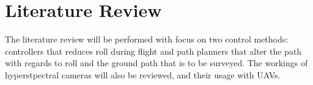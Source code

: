 \section{Literature Review}

The literature review will be performed with focus on two control methods: controllers that reduces roll during flight and path planners that alter the path with regards to roll and the ground path that is to be surveyed. The workings of hyperstpectral cameras will also be reviewed, and their usage with UAVs.